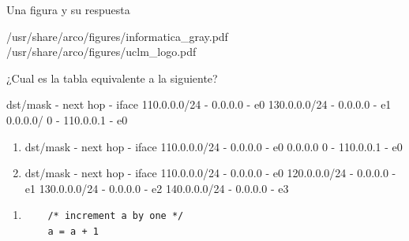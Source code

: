 \documentclass[english]{arco-exam}
\begin{document}
\begin{questions}
\begin{multiQuestion}[4]
  \end{multiQuestion}


\begin{simpleQuestion}[5]
  Una figura y su respuesta

                     {/usr/share/arco/figures/informatica_gray.pdf}
                     {/usr/share/arco/figures/uclm_logo.pdf}
\end{simpleQuestion}


\begin{simpleQuestion}[8]
  ¿Cual es la tabla equivalente a la siguiente?

  \begin{listing}[style=pre]
  dst/mask     - next hop  - iface
  110.0.0.0/24 -   0.0.0.0 - e0
  130.0.0.0/24 -   0.0.0.0 - e1
  0.0.0.0/ 0   - 110.0.0.1 - e0
  \end{listing}

  \begin{enumerate}[label=\alph*)]
  \item
  \begin{listing}[style=pre]
dst/mask     - next hop  - iface
110.0.0.0/24 -   0.0.0.0 - e0
0.0.0.0  0   - 110.0.0.1 - e0
\end{listing}

\item
  \begin{listing}[style=pre]
dst/mask     - next hop  - iface
110.0.0.0/24 -   0.0.0.0 - e0
120.0.0.0/24 -   0.0.0.0 - e1
130.0.0.0/24 -   0.0.0.0 - e2
140.0.0.0/24 -   0.0.0.0 - e3
\end{listing}
\end{enumerate}


\correctChoice{\mbox{}}
\choice{\mbox{}}
\end{simpleQuestion}

\end{questions}

\begin{enumerate}
\item
  \begin{lstlisting}
    /* increment a by one */
    a = a + 1
  \end{lstlisting}
\end{enumerate}
\end{document}
